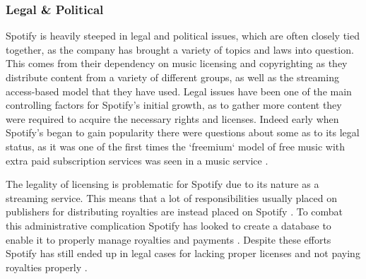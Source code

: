 \subsubsection{Legal \& Political}
Spotify is heavily steeped in legal and political issues, which are often closely tied together, as the company has brought a variety of topics and laws into question. This comes from their dependency on music licensing and copyrighting as they distribute content from a variety of different groups, as well as the streaming access-based model that they have used. Legal issues have been one of the main controlling factors for Spotify's initial growth, as to gather more content they were required to acquire the necessary rights and licenses. Indeed early when Spotify's began to gain popularity there were questions about some as to its legal status, as it was one of the first times the `freemium` model of free music with extra paid subscription services was seen in a music service \parencite{spotify_legal_question, spotify_just_begin}.
\par
The legality of licensing is problematic for Spotify due to its nature as a streaming service. This means that a lot of responsibilities usually placed on publishers for distributing royalties are instead placed on Spotify \parencite{spotify_legal_tangle_billboard}. To combat this administrative complication Spotify has looked to create a database to enable it to properly manage royalties and payments \parencite{spotify_royalties_database, spotify_royalties_database_billboard}. Despite these efforts Spotify has still ended up in legal cases for lacking proper licenses and not paying royalties properly \parencite{spotify_legal_tangle_billboard, spotify_second_lawsuit, spotify_publishers_settlement}.